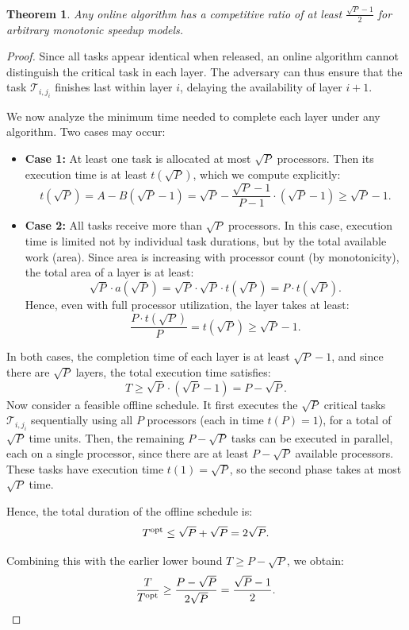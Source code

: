 \documentclass{article}
\newtheorem{theorem}{Theorem}
\newcommand\task{\mathcal{T}}
\newcommand\opt{\textnormal{opt}\xspace}
\begin{document}
\begin{theorem}
\label{thm.lowerbound}
Any online algorithm has a competitive ratio of at least \( \frac{\sqrt{P}-1}{2} \) for arbitrary monotonic speedup models.
\end{theorem}

\begin{proof}
Since all tasks appear identical when released, an online algorithm cannot distinguish the critical task in each layer. The adversary can thus ensure that the task \( \task_{i,j_i} \) finishes last within layer \( i \), delaying the availability of layer \( i+1 \).

We now analyze the minimum time needed to complete each layer under any algorithm. Two cases may occur:

\begin{itemize}
    \item \textbf{Case 1:} At least one task is allocated at most \( \sqrt{P} \) processors. Then its execution time is at least \( t(\sqrt{P}) \), which we compute explicitly:
    \[
    t(\sqrt{P}) = A - B(\sqrt{P} - 1) = \sqrt{P} - \frac{\sqrt{P} - 1}{P - 1} \cdot (\sqrt{P} - 1) \ge \sqrt{P} - 1.
    \]

    \item \textbf{Case 2:} All tasks receive more than \( \sqrt{P} \) processors. In this case, execution time is limited not by individual task durations, but by the total available work (area). Since area is increasing with processor count (by monotonicity), the total area of a layer is at least:
    \[
    \sqrt{P} \cdot a(\sqrt{P}) = \sqrt{P} \cdot \sqrt{P} \cdot t(\sqrt{P}) = P \cdot t(\sqrt{P}).
    \]
    Hence, even with full processor utilization, the layer takes at least:
    \[
    \frac{P \cdot t(\sqrt{P})}{P} = t(\sqrt{P}) \ge \sqrt{P} - 1.
    \]
\end{itemize}

In both cases, the completion time of each layer is at least \( \sqrt{P} - 1 \), and since there are \( \sqrt{P} \) layers, the total execution time satisfies:
\[
T \ge \sqrt{P} \cdot (\sqrt{P} - 1) = P - \sqrt{P}.
\]
Now consider a feasible offline schedule. It first executes the \( \sqrt{P} \) critical tasks \( \task_{i,j_i} \) sequentially using all \( P \) processors (each in time \( t(P) = 1 \)), for a total of \( \sqrt{P} \) time units. Then, the remaining \( P - \sqrt{P} \) tasks can be executed in parallel, each on a single processor, since there are at least \( P - \sqrt{P} \) available processors. These tasks have execution time \( t(1) = \sqrt{P} \), so the second phase takes at most \( \sqrt{P} \) time.

Hence, the total duration of the offline schedule is:
\[
T^{\opt} \le \sqrt{P} + \sqrt{P} = 2\sqrt{P}.
\]

Combining this with the earlier lower bound \( T \ge P - \sqrt{P} \), we obtain:
\[
\frac{T}{T^{\opt}} \ge \frac{P - \sqrt{P}}{2\sqrt{P}} =\frac{\sqrt{P}-1}{2}.
\]

\end{proof}
\end{document}
